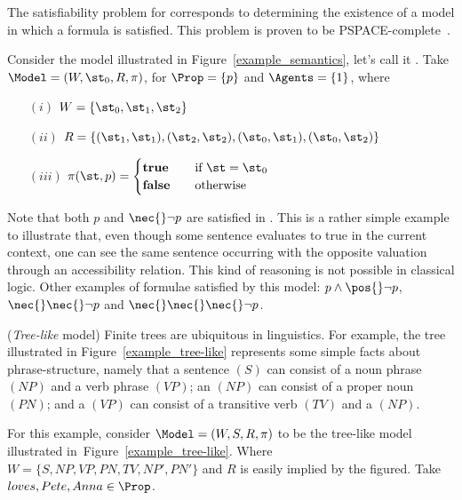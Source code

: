 The satisfiability problem for  corresponds to determining the
existence of a model in which a formula is satisfied. This problem is proven to be
PSPACE-complete~\cite{Spaan:coml}.

\begin{example}
    Consider the model illustrated in Figure~\ref{example_semantics}, let's call
    it \Model. Take $\Model = (W, \st_0, R, \pi)$, for $\Prop = \{p\}$ and
    $\Agents = \{1\}$, where 
    \begin{enumerate}
        \item[$(i)$] $W = \{\st_0, \st_1, \st_2\}$
        \item[$(ii)$] $R = \{(\st_1, \st_1), (\st_2, \st_2),
            (\st_0, \st_1), (\st_0, \st_2)\}$
        \item[$(iii)$] $ \pi(\st, p) = 
            \begin{cases} 
                \text{\textbf{true}}    & \quad \text{if } \st = \st_0\\
                \text{\textbf{false}}   & \quad \text{otherwise}
            \end{cases}
                       $
    \end{enumerate}

    Note that both $p$ and $\nec{} \neg p$ are satisfied in \Model. This is a
    rather simple example to illustrate that, even though some sentence
    evaluates to true in the current context, one can see the same sentence
    occurring with the opposite valuation through an accessibility relation.
    This kind of reasoning is not possible in classical logic. Other examples of
    formulae satisfied by this model: $p \land \pos{} \neg p$, $\nec{}\nec{}
    \neg p$ and $\nec{} \nec {} \nec{} \neg p$.
\end{example}



\begin{example}
    (\emph{Tree-like} model) 
    Finite trees are ubiquitous in linguistics. For example, the tree
    illustrated in Figure~\ref{example_tree-like} represents some simple facts
    about phrase-structure, namely that a sentence $(S)$ can consist of a noun
    phrase $(NP)$ and a verb phrase $(VP)$; an $(NP)$ can consist of a proper
    noun $(PN)$; and a $(VP)$ can consist of a transitive verb $(TV)$ and a
    $(NP)$.

    For this example, consider $\Model = (W, S, R, \pi)$ to be the tree-like
    model illustrated in~Figure~\ref{example_tree-like}. Where $W = \{S, NP, VP,
    PN, TV, NP', PN'\}$ and $R$ is easily implied by the figured.
    Take $loves, Pete, Anna \in \Prop$.
\end{example}

